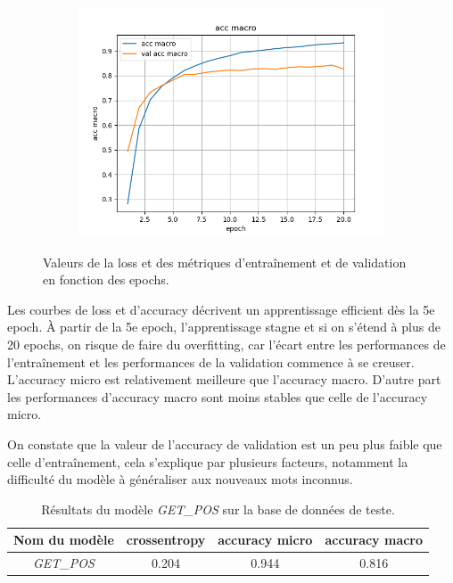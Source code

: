 \documentclass[a4paper]{article}
\begin{document}
\begin{figure}[H]
\begin{subfigure}{0.32\textwidth}
    \end{subfigure}
    \begin{subfigure}{0.32\textwidth}
        \centering
        \includegraphics[width=\linewidth]{../logs/get_pos/acc macro.png}
    \end{subfigure}
    \caption{Valeurs de la loss et des métriques d'entraînement et de validation en fonction des epochs.}
\end{figure}

Les courbes de loss et d'accuracy décrivent un apprentissage efficient dès la 5e epoch. À partir de la 5e epoch, l'apprentissage
stagne et si on s'étend à plus de 20 epochs, on risque de faire du overfitting, car l'écart entre les performances de l'entraînement
et les performances de la validation commence à se creuser. 
L'accuracy micro est relativement meilleure que l'accuracy macro. D'autre part les performances d'accuracy macro sont moins stables que celle de l'accuracy micro. 

On constate que la valeur de l'accuracy de validation est un peu plus faible que celle d'entraînement, cela 
s'explique par plusieurs facteurs, notamment la difficulté du modèle à généraliser aux nouveaux mots inconnus.


\begin{table}[H]
    \centering
    \begin{tabular}{|c|c|c|c|}
        \hline
        Nom du modèle & crossentropy & accuracy micro & accuracy macro \\
        \hline
        \textit{GET\_POS} & 0.204 & 0.944 & 0.816\\
        \hline
    \end{tabular}
    \caption{Résultats du modèle \textit{GET\_POS} sur la base de données de teste.}
    \label{tab:test getpos}
\end{table}
\end{document}
